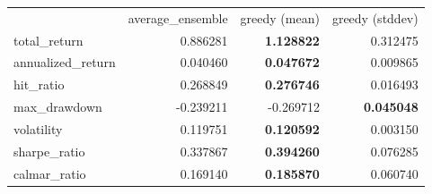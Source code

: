 \begin{tabular}{lrrr}
 & average_ensemble & greedy (mean) & greedy (stddev) \\
total_return & 0.886281 & \bfseries 1.128822 & 0.312475 \\
annualized_return & 0.040460 & \bfseries 0.047672 & 0.009865 \\
hit_ratio & 0.268849 & \bfseries 0.276746 & 0.016493 \\
max_drawdown & -0.239211 & -0.269712 & \bfseries 0.045048 \\
volatility & 0.119751 & \bfseries 0.120592 & 0.003150 \\
sharpe_ratio & 0.337867 & \bfseries 0.394260 & 0.076285 \\
calmar_ratio & 0.169140 & \bfseries 0.185870 & 0.060740 \\
\end{tabular}
